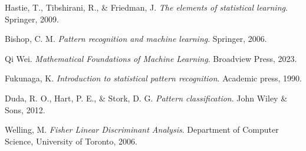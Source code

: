 \begin{thebibliography}{99}
Hastie, T., Tibshirani, R., \& Friedman, J.
\newblock \emph{The elements of statistical learning}.
\newblock Springer, 2009.

Bishop, C. M.
\newblock \emph{Pattern recognition and machine learning}.
\newblock Springer, 2006.

Qi Wei.
\newblock \emph{Mathematical Foundations of Machine Learning}.
\newblock Broadview Press, 2023.

Fukunaga, K.
\newblock \emph{Introduction to statistical pattern recognition}.
\newblock Academic press, 1990.

Duda, R. O., Hart, P. E., \& Stork, D. G.
\newblock \emph{Pattern classification}.
\newblock John Wiley \& Sons, 2012.

Welling, M.
\newblock \emph{Fisher Linear Discriminant Analysis}.
\newblock Department of Computer Science, University of Toronto, 2006.
\end{thebibliography}
